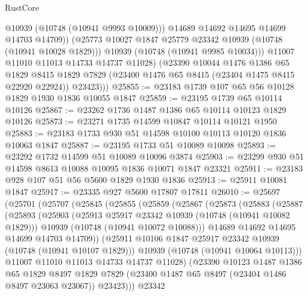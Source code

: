 \begin{lexlean}{RustCore}
\begin{coremodule}
                  @10939
                  (@10748 (@10941 @9993 @10009)))
                @14689
                @14692
                @14695
                @14699
                @14703
                @14709))
            (@25773 @10027 @1847 @25779 @23342 @10939 (@10748 (@10941 @10028 @1829)))
            @10939
            (@10748 (@10941 @9985 @10034)))
          @11007
          @11010
          @11013
          @14733
          @14737
          @11028)
        (@23390
          @10044
          @1476
          @1386
          @65
          @1829
          @8415
          @1829
          @7829
          (@23400 @1476 @65 @8415 (@23404 @1475 @8415 @22920 @22924))
          @23423)))
@25855 := @23183 @1739 @107 @65 @56 @10128 @1829 @1930 @1836 @10055 @1847
@25859 := @23195 @1739 @65 @10114 @10126
@25867 := @23262 @1736 @1487 @1386 @65 @10114 @10123 @1829 @10126
@25873 := @23271 @1735 @14599 @10847 @10114 @10121 @1950
@25883 := @23183 @1733 @930 @51 @14598 @10100 @10113 @10120 @1836 @10063 @1847
@25887 := @23195 @1733 @51 @10089 @10098
@25893 := @23292 @1732 @14599 @51 @10089 @10096 @3874
@25903 := @23299 @930 @51 @14598 @8613 @10088 @10095 @1836 @10071 @1847 @23321
@25911 := @23183 @928 @107 @51 @56 @5600 @1829 @1930 @1836
@25913 := @25911 @10081 @1847
@25917 := @23335 @927 @5600 @17807 @17811
@26010 := @25697
    (@25701
      (@25707
        (@25845
          (@25855
            (@25859
              (@25867
                (@25873
                  (@25883
                    (@25887
                      (@25893
                        (@25903
                          (@25913 @25917 @23342 @10939 (@10748 (@10941 @10082 @1829)))
                          @10939
                          (@10748 (@10941 @10072 @10088)))
                        @14689
                        @14692
                        @14695
                        @14699
                        @14703
                        @14709))
                    (@25911 @10106 @1847 @25917 @23342 @10939 (@10748 (@10941 @10107 @1829)))
                    @10939
                    (@10748 (@10941 @10064 @10113)))
                  @11007
                  @11010
                  @11013
                  @14733
                  @14737
                  @11028)
                (@23390
                  @10123
                  @1487
                  @1386
                  @65
                  @1829
                  @8497
                  @1829
                  @7829
                  (@23400 @1487 @65 @8497 (@23404 @1486 @8497 @23063 @23067))
                  @23423)))
            @23342

\end{coremodule}
\end{lexlean}
